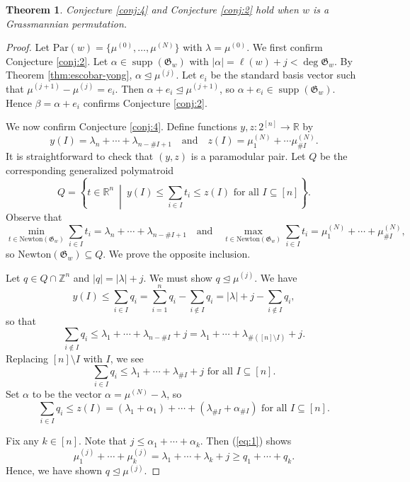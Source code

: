 \documentclass{amsart}
\newtheorem{theorem}{Theorem}[section]
\theoremstyle{definition}
\theoremstyle{named}
\DeclareMathOperator{\supp}{supp}
\begin{document}
 	\begin{theorem}
 		\label{thm:grass}
 		Conjecture \ref{conj:4} and Conjecture \ref{conj:2} hold when $w$ is a Grassmannian permutation.
 	\end{theorem}
 	\begin{proof}
 		Let $\mathrm{Par}(w)=\{\mu^{(0)},\ldots,\mu^{(N)} \}$ with $\lambda=\mu^{(0)}$. We first confirm Conjecture \ref{conj:2}. Let $\alpha\in\supp(\mathfrak{G}_w)$ with $|\alpha|=\ell(w)+j<\deg \mathfrak{G}_w$. By Theorem \ref{thm:escobar-yong}, $\alpha\trianglelefteq \mu^{(j)}$. Let $e_i$ be the standard basis vector such that $\mu^{(j+1)}-\mu^{(j)} = e_i$. Then $\alpha+e_i\trianglelefteq \mu^{(j+1)}$, so $\alpha+e_i\in\supp(\mathfrak{G}_w)$. Hence $\beta=\alpha+e_i$ confirms Conjecture \ref{conj:2}.
 		
 		We now confirm Conjecture \ref{conj:4}. Define functions $y,z:2^{[n]}\to\mathbb{R}$ by
 		\[y(I) = \lambda_n + \cdots + \lambda_{n-\#I+1 }\quad \mbox{and}\quad z(I)=\mu^{(N)}_1+\cdots\mu^{(N)}_{\#I}.\]
 		It is straightforward to check that $(y,z)$ is a paramodular pair. Let $Q$ be the corresponding generalized polymatroid
 		\[Q=\left\{t\in \mathbb{R}^n \ \middle| \ y(I)\leq \sum_{i\in I} t_i\leq z(I) \mbox{ for all } I\subseteq [n]\right\}. \]
 		Observe that 
 		\[\min_{t\in\mathrm{Newton}(\mathfrak{G}_w)} \sum_{i\in I}t_i = \lambda_n + \cdots + \lambda_{n-\#I+1 } \quad \mbox{and}\quad \max_{t\in\mathrm{Newton}(\mathfrak{G}_w)} \sum_{i\in I}t_i = \mu^{(N)}_1+\cdots+\mu^{(N)}_{\#I},\]
 		so $\mathrm{Newton}(\mathfrak{G}_w) \subseteq Q$. We prove the opposite inclusion.
 		
 		Let $q\in Q\cap\mathbb{Z}^n$ and $|q| = |\lambda|+j$. We must show $q\trianglelefteq \mu^{(j)}$. We have
 		\[y(I)\leq \sum_{i\in I} q_i=\sum_{i=1}^n q_i-\sum_{i\notin I}q_i=|\lambda|+j -\sum_{i\notin I}q_i, \] 
 		so that
 		\[\sum_{i\notin I}q_i\leq \lambda_1+\cdots+\lambda_{n-\#I}+j =\lambda_1+\cdots+\lambda_{\#([n]\setminus I)} +j. \]
 		Replacing $[n]\setminus I$ with $I$, we see
 		\begin{equation}
 			\label{eq:1}
 			\sum_{i\in I}q_i\leq \lambda_1+\cdots+\lambda_{\#I} +j \mbox{ for all } I\subseteq [n].
 		\end{equation}
 		Set $\alpha$ to be the vector $\alpha=\mu^{(N)}-\lambda$, so 
 		\begin{equation}
 			\label{eq:2}
 			\sum_{i\in I}q_i\leq z(I)=(\lambda_1+\alpha_1)+\cdots+(\lambda_{\#I}+\alpha_{\#I}) \mbox{ for all } I\subseteq [n].
 		\end{equation}
 		
 		
 		Fix any $k\in [n]$. Note that $j\leq \alpha_1+\cdots+\alpha_k$. Then (\ref{eq:1}) shows
 		\[\mu^{(j)}_1+\cdots+\mu^{(j)}_k= \lambda_1+\cdots+\lambda_k+j\geq q_1+\cdots+q_k. \]
 		Hence, we have shown $q\trianglelefteq \mu^{(j)}$.
 	\end{proof}
	
\end{document}
